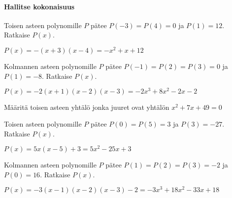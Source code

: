 \begin{tehtavasivu}
\paragraph*{Hallitse kokonaisuus}

\begin{tehtava}
    Toisen asteen polynomille $P$ pätee $P(-3)=P(4)=0$ ja $P(1)=12$. Ratkaise $P(x)$.
    \begin{vastaus}
        $P(x)=-(x+3)(x-4)=-x^2+x+12$
    \end{vastaus}
\end{tehtava}

\begin{tehtava}
    Kolmannen asteen polynomille $P$ pätee $P(-1)=P(2)=P(3)=0$ ja $P(1)=-8$. Ratkaise $P(x)$.
    \begin{vastaus}
        $P(x)=-2(x+1)(x-2)(x-3)=-2x^3+8x^2-2x-2$
    \end{vastaus}
\end{tehtava}

\begin{tehtava}
   Määritä toisen asteen yhtälö jonka juuret ovat yhtälön $ x^2+7x+49 =0 $ 
 \begin{alakohdat}
    \end{alakohdat}
    \begin{vastaus}
        \begin{alakohdat}
        \end{alakohdat}
    \end{vastaus}
\end{tehtava}

\begin{tehtava}
    Toisen asteen polynomille $P$ pätee $P(0)=P(5)=3$ ja $P(3)=-27$. Ratkaise $P(x)$.
    \begin{vastaus}
        $P(x)=5x(x-5)+3=5x^2-25x+3$
    \end{vastaus}
\end{tehtava}

\begin{tehtava}
    Kolmannen asteen polynomille $P$ pätee $P(1)=P(2)=P(3)=-2$ ja $P(0)=16$. Ratkaise $P(x)$.
    \begin{vastaus}
        $P(x)=-3(x-1)(x-2)(x-3)-2=-3x^3+18x^2-33x+18$
    \end{vastaus}
\end{tehtava}


\end{tehtavasivu}
